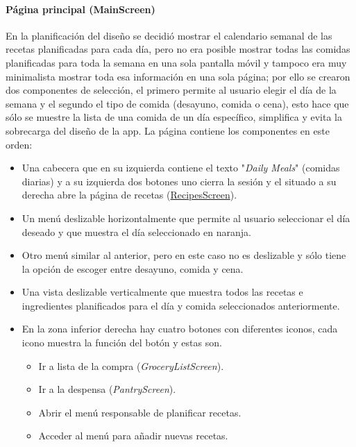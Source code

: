 \documentclass[twoside, openright, 11pt]{report}
\begin{document}
				\paragraph{Página principal (MainScreen)}\label{MainScreen}

					En la planificación del diseño se decidió mostrar el calendario semanal de las recetas planificadas para cada día, pero no era posible mostrar todas las comidas planificadas para toda la semana en una sola pantalla móvil y tampoco era muy minimalista mostrar toda esa información en una sola página; por ello se crearon dos componentes de selección, el primero permite al usuario elegir el día de la semana y el segundo el tipo de comida (desayuno, comida o cena), esto hace que sólo se muestre la lista de una comida de un día específico, simplifica y evita la sobrecarga del diseño de la app.
					La página contiene los componentes en este orden:
					
					\begin{itemize}
						\item Una cabecera que en su izquierda contiene el texto "\textit{Daily Meals}" (comidas diarias) y a su izquierda dos botones uno cierra la sesión y el situado a su derecha abre la página de recetas (\hyperref[RecipesScreen]{RecipesScreen}).
						\item Un menú deslizable horizontalmente que permite al usuario seleccionar el día deseado y que muestra el día seleccionado en naranja.
						\item Otro menú similar al anterior, pero en este caso no es deslizable y sólo tiene la opción de escoger entre desayuno, comida y cena.
						\item Una vista deslizable verticalmente que muestra todos las recetas e ingredientes planificados para el día y comida seleccionados anteriormente.
						\item En la zona inferior derecha hay cuatro botones con diferentes iconos, cada icono muestra la función del botón y estas son.
						\begin{itemize}
							\item Ir a lista de la compra (\textit{GroceryListScreen}).
							\item Ir a la despensa (\textit{PantryScreen}).
							\item Abrir el menú responsable de planificar recetas.
							\item Acceder al menú para añadir nuevas recetas.
						\end{itemize}
					\end{itemize}
					
\end{document}
